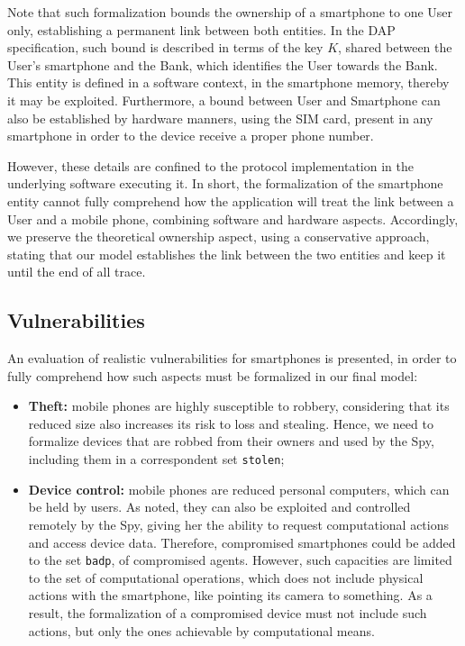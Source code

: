 Note that such formalization bounds the ownership of a smartphone to one User only, establishing a permanent link between both entities. In the DAP specification, such bound is described in terms of the key $K$, shared between the User's smartphone and the Bank, which identifies the User towards the Bank. This entity is defined in a software context, in the smartphone memory, thereby it may be exploited. Furthermore, a bound between User and Smartphone can also be established by hardware manners, using the SIM card, present in any smartphone in order to the device receive a proper phone number.

However, these details are confined to the protocol implementation in the underlying software executing it. In short, the formalization of the smartphone entity cannot fully comprehend how the application will treat the link between a User and a mobile phone, combining software and hardware aspects. Accordingly, we preserve the theoretical ownership aspect, using a conservative approach, stating that our model establishes the link between the two entities and keep it until the end of all trace.



\subsection{Vulnerabilities}
An evaluation of realistic vulnerabilities for smartphones is presented, in order to fully comprehend how such aspects must be formalized in our final model:

\begin{itemize}
  \item \textbf{Theft:} mobile phones are highly susceptible to robbery, considering that its reduced size also increases its risk to loss and stealing. Hence, we need to formalize devices that are robbed from their owners and used by the Spy, including them in a correspondent set \texttt{stolen};

  \item \textbf{Device control:} mobile phones are reduced personal computers, which can be held by users. As noted, they can also be exploited and controlled remotely by the Spy, giving her the ability to request computational actions and access device data. Therefore, compromised smartphones could be added to the set \texttt{badp}, of compromised agents. However, such capacities are limited to the set of computational operations, which does not include physical actions with the smartphone, like pointing its camera to something. As a result, the formalization of a compromised device must not include such actions, but only the ones achievable by computational means.
\end{itemize}

